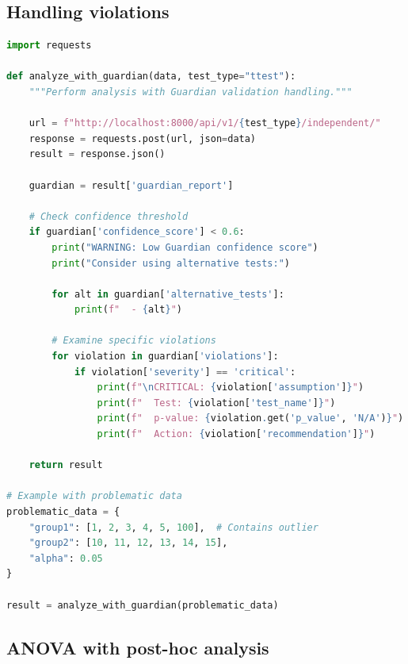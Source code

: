 \documentclass[article]{jss}
\begin{document}
\subsection{Handling violations}

\begin{lstlisting}[language=Python,caption={Handling Guardian violations}]
import requests

def analyze_with_guardian(data, test_type="ttest"):
    """Perform analysis with Guardian validation handling."""

    url = f"http://localhost:8000/api/v1/{test_type}/independent/"
    response = requests.post(url, json=data)
    result = response.json()

    guardian = result['guardian_report']

    # Check confidence threshold
    if guardian['confidence_score'] < 0.6:
        print("WARNING: Low Guardian confidence score")
        print("Consider using alternative tests:")

        for alt in guardian['alternative_tests']:
            print(f"  - {alt}")

        # Examine specific violations
        for violation in guardian['violations']:
            if violation['severity'] == 'critical':
                print(f"\nCRITICAL: {violation['assumption']}")
                print(f"  Test: {violation['test_name']}")
                print(f"  p-value: {violation.get('p_value', 'N/A')}")
                print(f"  Action: {violation['recommendation']}")

    return result

# Example with problematic data
problematic_data = {
    "group1": [1, 2, 3, 4, 5, 100],  # Contains outlier
    "group2": [10, 11, 12, 13, 14, 15],
    "alpha": 0.05
}

result = analyze_with_guardian(problematic_data)
\end{lstlisting}

\subsection{ANOVA with post-hoc analysis}
\end{document}
